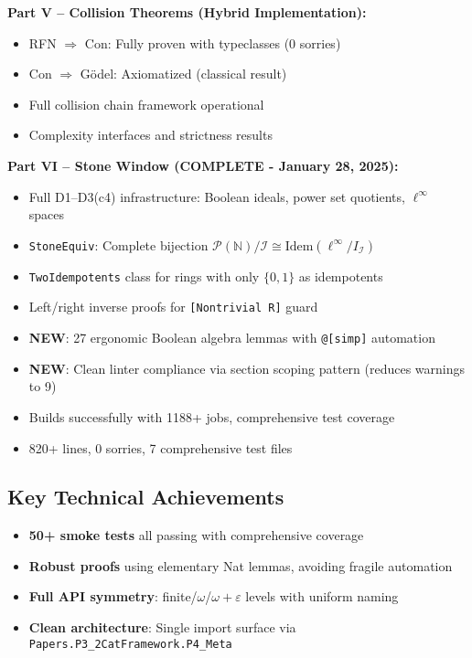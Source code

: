 \documentclass[11pt]{article}
\theoremstyle{definition}
\theoremstyle{remark}
\begin{document}
\textbf{Part V -- Collision Theorems (Hybrid Implementation):}
\begin{itemize}
\item RFN $\Rightarrow$ Con: Fully proven with typeclasses (0 sorries)
\item Con $\Rightarrow$ G\"odel: Axiomatized (classical result)
\item Full collision chain framework operational
\item Complexity interfaces and strictness results
\end{itemize}

\textbf{Part VI -- Stone Window (COMPLETE - January 28, 2025):}
\begin{itemize}
\item Full D1--D3(c4) infrastructure: Boolean ideals, power set quotients, $\ell^\infty$ spaces
\item \texttt{StoneEquiv}: Complete bijection $\mathcal{P}(\mathbb{N})/\mathcal{I} \cong \text{Idem}(\ell^\infty/I_{\mathcal{I}})$
\item \texttt{TwoIdempotents} class for rings with only $\{0,1\}$ as idempotents
\item Left/right inverse proofs for \texttt{[Nontrivial R]} guard
\item \textbf{NEW}: 27 ergonomic Boolean algebra lemmas with \texttt{@[simp]} automation
\item \textbf{NEW}: Clean linter compliance via section scoping pattern (reduces warnings to 9)
\item Builds successfully with 1188+ jobs, comprehensive test coverage
\item 820+ lines, 0 sorries, 7 comprehensive test files
\end{itemize}

\subsection*{Key Technical Achievements}
\begin{itemize}
\item \textbf{50+ smoke tests} all passing with comprehensive coverage
\item \textbf{Robust proofs} using elementary Nat lemmas, avoiding fragile automation
\item \textbf{Full API symmetry}: finite/$\omega$/$\omega+\varepsilon$ levels with uniform naming
\item \textbf{Clean architecture}: Single import surface via \texttt{Papers.P3\_2CatFramework.P4\_Meta}
\end{itemize}
\end{document}
